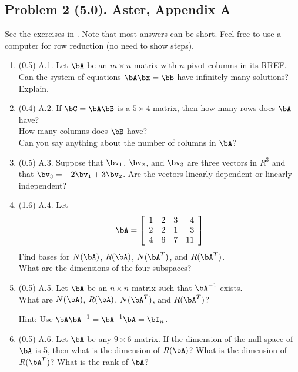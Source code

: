 \documentclass[11pt,titlepage,fleqn]{article}
\begin{document}
\subsection*{Problem 2 (5.0). Aster, Appendix A}

See the exercises in \citet[][Section A.12]{AsterE2}. Note that most answers can be short. Feel free to use a computer for row reduction (no need to show steps).

\begin{enumerate}
\item (0.5) A.1. Let $\bA$ be an $m \times n$ matrix with $n$ pivot columns in its RREF. \\
Can the system of equations $\bA\bx=\bb$ have infinitely many solutions? Explain.

\item (0.4) A.2. If $\bC = \bA\bB$ is a $5 \times 4$ matrix, then how many rows does $\bA$ have? \\
How many columns does $\bB$ have? \\
Can you say anything about the number of columns in $\bA$?

\item (0.5) A.3. Suppose that $\bv_1$, $\bv_2$, and $\bv_3$ are three vectors in $R^3$ and that $\bv_3 = -2\bv_1 + 3\bv_2$. Are the vectors linearly dependent or linearly independent?

\item (1.6) A.4. Let
%
\begin{equation*}
\bA =  \left[ \begin{array}{rrrr}
     1  &   2  &   3 & 4 \\
     2  &   2  &   1 & 3 \\
     4  &   6  &   7 & 11 \\
\end{array} \right]
\end{equation*}
%
Find bases for $N(\bA)$, $R(\bA)$, $N(\bA^T)$, and $R(\bA^T)$. \\
What are the dimensions of the four subspaces?

\item (0.5) A.5. Let $\bA$ be an $n \times n$ matrix such that $\bA^{-1}$ exists. \\
What are $N(\bA)$, $R(\bA)$, $N(\bA^T)$, and $R(\bA^T)$?

Hint: Use $\bA\bA^{-1} = \bA^{-1}\bA = \bI_n$.

\item (0.5) A.6. Let $\bA$ be any $9 \times 6$ matrix. If the dimension of the null space of $\bA$ is 5, then what is the dimension of $R(\bA)$? What is the dimension of $R(\bA^T)$? What is the rank of $\bA$?


\end{enumerate}
\end{document}
